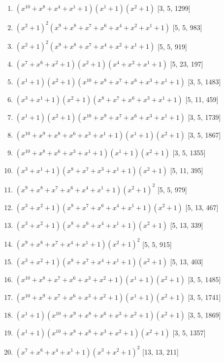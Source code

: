 \documentclass[10pt,twocolumn]{article}
\begin{document}
\begin{enumerate}
\item $(x^{10} + x^{8} + x^{4} + x^{1} + 1)(x^{1} + 1)(x^{2} + 1)$  [3, 5, 1299]
\item $(x^{2} + 1)^{2}(x^{9} + x^{8} + x^{7} + x^{6} + x^{4} + x^{2} + x^{1} + 1)$  [5, 5, 983]
\item $(x^{2} + 1)^{2}(x^{9} + x^{8} + x^{7} + x^{4} + x^{2} + x^{1} + 1)$  [5, 5, 919]
\item $(x^{7} + x^{6} + x^{2} + 1)(x^{2} + 1)(x^{4} + x^{2} + x^{1} + 1)$  [5, 23, 197]
\item $(x^{1} + 1)(x^{2} + 1)(x^{10} + x^{8} + x^{7} + x^{6} + x^{3} + x^{1} + 1)$  [3, 5, 1483]
\item $(x^{3} + x^{1} + 1)(x^{2} + 1)(x^{8} + x^{7} + x^{6} + x^{3} + x^{1} + 1)$  [5, 11, 459]
\item $(x^{1} + 1)(x^{2} + 1)(x^{10} + x^{9} + x^{7} + x^{6} + x^{3} + x^{1} + 1)$  [3, 5, 1739]
\item $(x^{10} + x^{9} + x^{8} + x^{6} + x^{3} + x^{1} + 1)(x^{1} + 1)(x^{2} + 1)$  [3, 5, 1867]
\item $(x^{10} + x^{8} + x^{6} + x^{3} + x^{1} + 1)(x^{1} + 1)(x^{2} + 1)$  [3, 5, 1355]
\item $(x^{3} + x^{1} + 1)(x^{8} + x^{7} + x^{3} + x^{1} + 1)(x^{2} + 1)$  [5, 11, 395]
\item $(x^{9} + x^{8} + x^{7} + x^{6} + x^{4} + x^{1} + 1)(x^{2} + 1)^{2}$  [5, 5, 979]
\item $(x^{3} + x^{2} + 1)(x^{8} + x^{7} + x^{6} + x^{4} + x^{1} + 1)(x^{2} + 1)$  [5, 13, 467]
\item $(x^{3} + x^{2} + 1)(x^{8} + x^{6} + x^{4} + x^{1} + 1)(x^{2} + 1)$  [5, 13, 339]
\item $(x^{9} + x^{8} + x^{7} + x^{4} + x^{1} + 1)(x^{2} + 1)^{2}$  [5, 5, 915]
\item $(x^{3} + x^{2} + 1)(x^{8} + x^{7} + x^{4} + x^{1} + 1)(x^{2} + 1)$  [5, 13, 403]
\item $(x^{10} + x^{8} + x^{7} + x^{6} + x^{3} + x^{2} + 1)(x^{1} + 1)(x^{2} + 1)$  [3, 5, 1485]
\item $(x^{10} + x^{9} + x^{7} + x^{6} + x^{3} + x^{2} + 1)(x^{1} + 1)(x^{2} + 1)$  [3, 5, 1741]
\item $(x^{1} + 1)(x^{10} + x^{9} + x^{8} + x^{6} + x^{3} + x^{2} + 1)(x^{2} + 1)$  [3, 5, 1869]
\item $(x^{1} + 1)(x^{10} + x^{8} + x^{6} + x^{3} + x^{2} + 1)(x^{2} + 1)$  [3, 5, 1357]
\item $(x^{7} + x^{6} + x^{4} + x^{1} + 1)(x^{3} + x^{2} + 1)^{2}$  [13, 13, 211]

\end{enumerate}
\end{document}
